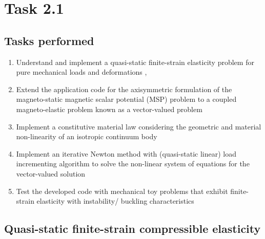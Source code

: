 \chapter{Task 2.1}

\section{Tasks performed}
\begin{enumerate}
\item Understand and implement a quasi-static finite-strain elasticity problem for pure mechanical loads and deformations \cite{Pelteret2016a}, \cite{Pelteret2012}
\item Extend the application code for the axisymmetric formulation of the magneto-static magnetic scalar potential (MSP) problem to a coupled magneto-elastic problem known as a vector-valued problem
\item Implement a constitutive material law considering the geometric and material non-linearity of an isotropic continuum body \cite{Wriggers2008}
\item Implement an iterative Newton method with (quasi-static linear) load incrementing algorithm to solve the non-linear system of equations for the vector-valued solution
\item Test the developed code with mechanical toy problems that exhibit finite-strain elasticity with instability/ buckling characteristics
\end{enumerate}

\section{Quasi-static finite-strain compressible elasticity}

